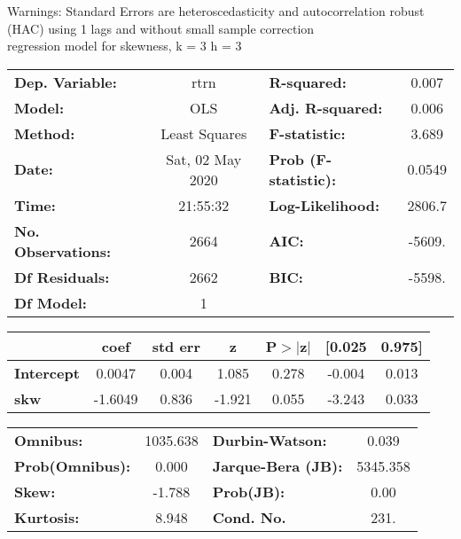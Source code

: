 Warnings: \newline
 [1] Standard Errors are heteroscedasticity and autocorrelation robust (HAC) using 1 lags and without small sample correction\\ 

regression model for skewness, k = 3 h = 3\begin{center}
\begin{tabular}{lclc}
\toprule
\textbf{Dep. Variable:}    &       rtrn       & \textbf{  R-squared:         } &     0.007   \\
\textbf{Model:}            &       OLS        & \textbf{  Adj. R-squared:    } &     0.006   \\
\textbf{Method:}           &  Least Squares   & \textbf{  F-statistic:       } &     3.689   \\
\textbf{Date:}             & Sat, 02 May 2020 & \textbf{  Prob (F-statistic):} &   0.0549    \\
\textbf{Time:}             &     21:55:32     & \textbf{  Log-Likelihood:    } &    2806.7   \\
\textbf{No. Observations:} &        2664      & \textbf{  AIC:               } &    -5609.   \\
\textbf{Df Residuals:}     &        2662      & \textbf{  BIC:               } &    -5598.   \\
\textbf{Df Model:}         &           1      & \textbf{                     } &             \\
\bottomrule
\end{tabular}
\begin{tabular}{lcccccc}
                   & \textbf{coef} & \textbf{std err} & \textbf{z} & \textbf{P$> |$z$|$} & \textbf{[0.025} & \textbf{0.975]}  \\
\midrule
\textbf{Intercept} &       0.0047  &        0.004     &     1.085  &         0.278        &       -0.004    &        0.013     \\
\textbf{skw}       &      -1.6049  &        0.836     &    -1.921  &         0.055        &       -3.243    &        0.033     \\
\bottomrule
\end{tabular}
\begin{tabular}{lclc}
\textbf{Omnibus:}       & 1035.638 & \textbf{  Durbin-Watson:     } &    0.039  \\
\textbf{Prob(Omnibus):} &   0.000  & \textbf{  Jarque-Bera (JB):  } & 5345.358  \\
\textbf{Skew:}          &  -1.788  & \textbf{  Prob(JB):          } &     0.00  \\
\textbf{Kurtosis:}      &   8.948  & \textbf{  Cond. No.          } &     231.  \\
\bottomrule
\end{tabular}
\end{center}


